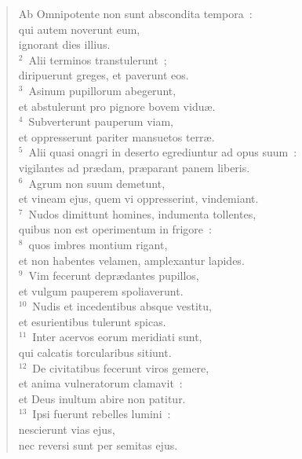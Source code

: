 \begin{flushleft}\begin{verse}\vspace{-19pt}\hspace{6pt}Ab Omnipotente non sunt abscondita tempora~:\\\hspace{6pt} qui autem noverunt eum,\\ ignorant dies illius.\\
${}^{2}$~Alii terminos transtulerunt~;\\ diripuerunt greges, et paverunt eos.\\
${}^{3}$~Asinum pupillorum abegerunt,\\ et abstulerunt pro pignore bovem vidu\ae .\\
${}^{4}$~Subverterunt pauperum viam,\\ et oppresserunt pariter mansuetos terr\ae .\\
${}^{5}$~Alii quasi onagri in deserto egrediuntur ad opus suum~:\\ vigilantes ad pr\ae dam, pr\ae parant panem liberis.\\
${}^{6}$~Agrum non suum demetunt,\\ et vineam ejus, quem vi oppresserint, vindemiant.\\
${}^{7}$~Nudos dimittunt homines, indumenta tollentes,\\ quibus non est operimentum in frigore~:\\
${}^{8}$~quos imbres montium rigant,\\ et non habentes velamen, amplexantur lapides.\\
${}^{9}$~Vim fecerunt depr\ae dantes pupillos,\\ et vulgum pauperem spoliaverunt.\\
${}^{10}$~Nudis et incedentibus absque vestitu,\\ et esurientibus tulerunt spicas.\\
${}^{11}$~Inter acervos eorum meridiati sunt,\\ qui calcatis torcularibus sitiunt.\\
${}^{12}$~De civitatibus fecerunt viros gemere,\\ et anima vulneratorum clamavit~:\\ et Deus inultum abire non patitur.\\
${}^{13}$~Ipsi fuerunt rebelles lumini~:\\ nescierunt vias ejus,\\ nec reversi sunt per semitas ejus.\\

\end{verse}
\end{flushleft}
